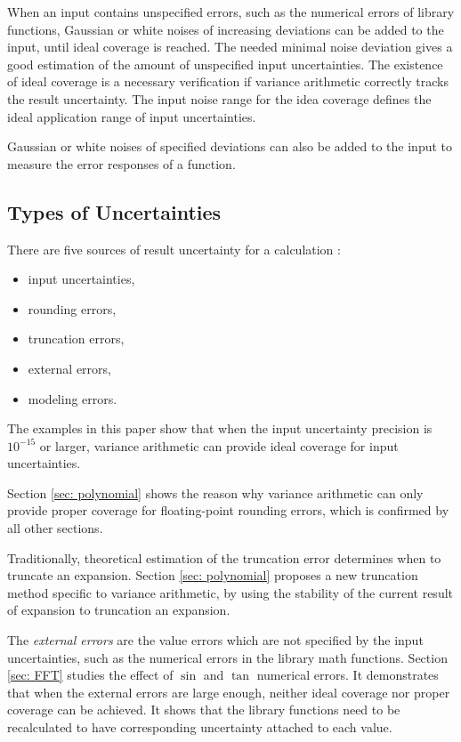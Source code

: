\documentclass[twoside]{article}
\numberwithin{equation}{section}
\begin{document}
When an input contains unspecified errors, such as the numerical errors of library functions, Gaussian or white noises of increasing deviations can be added to the input, until ideal coverage is reached.
The needed minimal noise deviation gives a good estimation of the amount of unspecified input uncertainties.
The existence of ideal coverage is a necessary verification if variance arithmetic correctly tracks the result uncertainty.
The input noise range for the idea coverage defines the ideal application range of input uncertainties.

Gaussian or white noises of specified deviations can also be added to the input to measure the error responses of a function.



\subsection{Types of Uncertainties}

There are five sources of result uncertainty for a calculation \cite{Statistical_Methods}\cite{Numerical_Recipes}:
\begin{itemize}
\item input uncertainties,
\item rounding errors,
\item truncation errors,
\item external errors,
\item modeling errors.
\end{itemize}

The examples in this paper show that when the input uncertainty precision is $10^{-15}$ or larger, variance arithmetic can provide ideal coverage for input uncertainties.

Section \ref{sec: polynomial} shows the reason why variance arithmetic can only provide proper coverage for floating-point rounding errors, which is confirmed by all other sections.

Traditionally, theoretical estimation of the truncation error determines when to truncate an expansion.
Section \ref{sec: polynomial} proposes a new truncation method specific to variance arithmetic, by using the stability of the current result of expansion to truncation an expansion. 

The \emph{external errors} are the value errors which are not specified by the input uncertainties, such as the numerical errors in the library math functions.
Section \ref{sec: FFT} studies the effect of $\sin$ and $\tan$ numerical errors.
It demonstrates that when the external errors are large enough, neither ideal coverage nor proper coverage can be achieved.
It shows that the library functions need to be recalculated to have corresponding uncertainty attached to each value.
\end{document}
